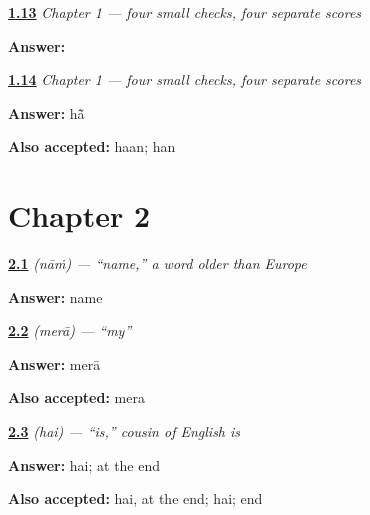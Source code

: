 \noindent\begin{minipage}[t]{\linewidth}
\raggedright
\hyperlink{review-PA-C01-practice-writing}{\textbf{1.13}} \emph{Chapter 1 — four small checks, four separate scores}\par
\small \textbf{Answer:} \par
\end{minipage}\par\medskip

\noindent\begin{minipage}[t]{\linewidth}
\raggedright
\hyperlink{review-PA-C01-practice-speaking}{\textbf{1.14}} \emph{Chapter 1 — four small checks, four separate scores}\par
\small \textbf{Answer:} hā̃\par
\footnotesize \textbf{Also accepted:} haan; han
\end{minipage}\par\medskip

\section*{Chapter 2}

\noindent\begin{minipage}[t]{\linewidth}
\raggedright
\hyperlink{review-PA-C02-naam-meaning}{\textbf{2.1}} \emph{ (nāṁ) — \textquotedblleft{}name,\textquotedblright{} a word older than Europe}\par
\small \textbf{Answer:} name\par
\end{minipage}\par\medskip

\noindent\begin{minipage}[t]{\linewidth}
\raggedright
\hyperlink{review-PA-C02-mera-meaning}{\textbf{2.2}} \emph{ (merā) — \textquotedblleft{}my\textquotedblright{}}\par
\small \textbf{Answer:} merā\par
\footnotesize \textbf{Also accepted:} mera
\end{minipage}\par\medskip

\noindent\begin{minipage}[t]{\linewidth}
\raggedright
\hyperlink{review-PA-C02-hai-order}{\textbf{2.3}} \emph{ (hai) — \textquotedblleft{}is,\textquotedblright{} cousin of English \emph{is}}\par
\small \textbf{Answer:} hai; at the end\par
\footnotesize \textbf{Also accepted:} hai, at the end; hai; end
\end{minipage}\par\medskip

